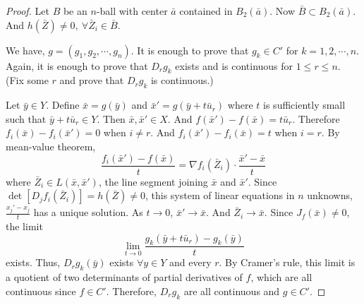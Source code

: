 \begin{proof}
Let $B$ be an $n$-ball with center $\bar{a}$ contained in $B_2(\bar{a})$.
Now $\bar{B} \subset B_2(\bar{a})$.
And $h(\bar{Z}) \ne 0,\ \forall \bar{Z}_i \in \bar{B}$.

We have, $g = (g_1, g_2, \cdots,g_n)$.
It is enough to prove that $g_k \in C'$ for $k=1,2,\cdots,n$.
Again, it is enough to prove that $D_rg_k$ exists and is continuous for $1 \le r \le n$.
(Fix some $r$ and prove that $D_rg_k$ is continuous.)

Let $\bar{y} \in Y$.
Define $\bar{x} = g(\bar{y})$ and $\bar{x}' = g(\bar{y}+t\bar{u}_r)$ where $t$ is sufficiently small such that $\bar{y}+t\bar{u}_r \in Y$.
Then $\bar{x},\bar{x}' \in X$.
And $f(\bar{x}')-f(\bar{x}) = t\bar{u}_r$.
Therefore $f_i(\bar{x})-f_i(\bar{x}') = 0$ when $i \ne r$.
And $f_i(\bar{x}')-f_i(\bar{x}) = t$ when $i = r$.
By mean-value theorem,
	\[ \frac{f_i(\bar{x}') - f(\bar{x})}{t} = \nabla f_i(\bar{Z}_i) \cdot \frac{\bar{x}'-\bar{x}}{t} \]
where $\bar{Z}_i \in L(\bar{x},\bar{x}')$, the line segment joining $\bar{x}$ and $\bar{x}'$.
Since $\det[D_jf_i(\bar{Z}_i)] = h(\bar{Z}) \ne 0$, this system of linear equations in $n$ unknowns, $\frac{x_j'-x_j}{t}$ has a unique solution.
As $t \to 0$, $\bar{x}' \to \bar{x}$.
And $\bar{Z}_i \to \bar{x}$.
Since $J_f(\bar{x}) \ne 0$, the limit
	\[ \lim_{t \to 0} \frac{g_k(\bar{y}+t\bar{u}_r)-g_k(\bar{y})}{t} \]
exists.
Thus, $D_rg_k(\bar{y})$ exists $\forall y \in Y$ and every $r$.	
By Cramer's rule, this limit is a quotient of two determinants of partial derivatives of $f$, which are all continuous since $f \in C'$.
Therefore, $D_rg_k$ are all continuous and $g \in C'$.
\end{proof}

